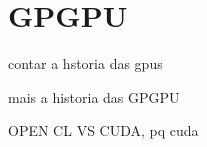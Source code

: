 \chapter{GPGPU}
\label{cap:gpgpu}

contar a hstoria das gpus

mais a historia das GPGPU

OPEN CL VS CUDA,  pq cuda
